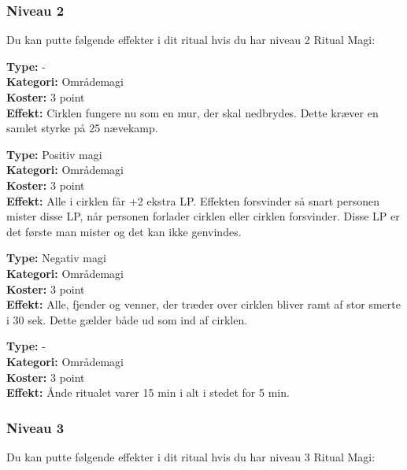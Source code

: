 \subsubsection*{Niveau 2}
Du kan putte følgende effekter i dit ritual hvis du har niveau 2 Ritual Magi:

\begin{ritual*}
\textbf{Type:} -\\
\textbf{Kategori:} Områdemagi\\
\textbf{Koster:} 3 point\\
\textbf{Effekt:} Cirklen fungere nu som en mur, der skal nedbrydes. Dette kræver en samlet styrke på 25 nævekamp.
\end{ritual*}

\begin{ritual*}
\textbf{Type:} Positiv magi\\
\textbf{Kategori:} Områdemagi\\
\textbf{Koster:} 3 point\\
\textbf{Effekt:} Alle i cirklen får +2 ekstra LP. Effekten forsvinder så snart personen mister disse LP, når personen forlader cirklen eller cirklen forsvinder. Disse LP er det første man mister og det kan ikke genvindes.
\end{ritual*}

\begin{ritual*}
\textbf{Type:} Negativ magi\\
\textbf{Kategori:} Områdemagi\\
\textbf{Koster:} 3 point\\
\textbf{Effekt:}  Alle, fjender og venner, der træder over cirklen bliver ramt af stor smerte i 30 sek.  Dette gælder både ud som ind af cirklen.
\end{ritual*}

\begin{ritual*}
\textbf{Type:} -\\
\textbf{Kategori:} Områdemagi\\
\textbf{Koster:} 3 point\\
\textbf{Effekt:} Ånde ritualet varer 15 min i alt i stedet for 5 min.
\end{ritual*}

\subsubsection*{Niveau 3}
Du kan putte følgende effekter i dit ritual hvis du har niveau 3 Ritual Magi:

